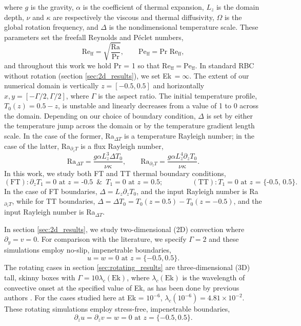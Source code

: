 \documentclass[aps, pre, onecolumn, nofootinbib, notitlepage, groupedaddress, amsfonts, amssymb, amsmath, longbibliography, superscriptaddress]{revtex4-1}
\newcommand{\Reff}{\ensuremath{\text{Re}_{\text{ff}}}}
\newcommand{\Peff}{\ensuremath{\text{Pe}_{\text{ff}}}}
\begin{document}
where $g$ is the gravity, $\alpha$ is the coefficient of thermal expansion, $L_z$ is the domain depth, $\nu$ and $\kappa$ are respectively the viscous and thermal diffusivity, $\Omega$ is the global rotation frequency, and $\Delta$ is the nondimensional temperature scale.
These parameters set the freefall Reynolds and P\'{e}clet numbers, 
\begin{equation}
\Reff = \sqrt{\frac{\text{Ra}}{\text{Pr}}},\qquad
\Peff = \text{Pr }\Reff,
\end{equation}
and throughout this work we hold Pr = 1 so that $\Reff = \Peff$.
In standard RBC without rotation (section \ref{sec:2d_results}), we set Ek$\,= \infty$.
The extent of our numerical domain is vertically $z = [-0.5, 0.5]$ and horizontally $x, y = [-\Gamma/2, \Gamma/2]$, where $\Gamma$ is the aspect ratio.
The initial temperature profile, $T_0(z) = 0.5 - z$, is unstable and linearly decreases from a value of 1 to 0 across the domain. 
Depending on our choice of boundary condition, $\Delta$ is set by either the temperature jump across the domain or by the temperature gradient length scale.
In the case of the former, Ra$_{\Delta T}$ is a temperature Rayleigh number; in the case of the latter, Ra$_{\partial_z T}$ is a flux Rayleigh number,
\begin{equation}
\text{Ra}_{\Delta T} = \frac{g \alpha L_z^3 \Delta T_0}{\nu\kappa}, \qquad 
\text{Ra}_{\partial_z T} = \frac{g \alpha L_z^4 \partial_z T_0}{\nu\kappa}.
\end{equation}
In this work, we study both FT and TT thermal boundary conditions,
\begin{equation}
(\text{FT}): \partial_z T_1 = 0 \text{ at $z$ = -0.5} \,\,\,\&\,\,\, T_1 = 0 \text{ at $z$ = 0.5};\qquad\qquad
(\text{TT}): T_1 = 0 \text{ at $z$ = \{-0.5, 0.5\}}.
\end{equation}
In the case of FT boundaries, $\Delta = L_z \partial_z T_0$, and the input Rayleigh number is Ra$_{\partial_z T}$, while for TT boundaries, $\Delta = \Delta T_0 =  T_0(z=0.5)-T_0(z=-0.5)$, and the input Rayleigh number is Ra$_{\Delta T}$.

In section \ref{sec:2d_results}, we study two-dimensional (2D) convection where $\partial_y = v = 0$.
For comparison with the literature, we specify $\Gamma = 2$ and these simulations employ no-slip, impenetrable boundaries,
\begin{equation}
u = w = 0 \, \, \text{at}\,\,z = \{-0.5, 0.5\}.
\label{eqn:vel_bcs}
\end{equation}
The rotating cases in section \ref{sec:rotating_results} are three-dimensional (3D) tall, skinny boxes with $\Gamma = 10\lambda_c(\text{Ek})$, where $\lambda_c(\text{Ek})$ is the wavelength of convective onset at the specified value of Ek, as has been done by previous authors \cite{stellmach&all2014}. 
For the cases studied here at Ek = $10^{-6}$, $\lambda_c(10^{-6}) = 4.81 \times 10^{-2}$.
These rotating simulations employ stress-free, impenetrable boundaries,
\begin{equation}
\partial_z u = \partial_z v = w = 0 \, \, \text{at}\,\,z = \{-0.5, 0.5\}.
\label{eqn:vel_bcs}
\end{equation}
\end{document}
